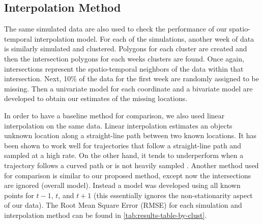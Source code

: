 \documentclass[12pt]{article}
\begin{document}
\hypertarget{interpolation-method}{%
\subsection{Interpolation Method}\label{interpolation-method}}

The same simulated data are also used to check the performance of our
spatio-temporal interpolation model. For each of the simulations,
another week of data is similarly simulated and clustered. Polygons for
each cluster are created and then the intersection polygons for each
weeks clusters are found. Once again, intersections represent the
spatio-temporal neighbors of the data within that intersection. Next,
10\% of the data for the first week are randomly assigned to be missing.
Then a univariate model for each coordinate and a bivariate model are
developed to obtain our estimates of the missing locations.

In order to have a baseline method for comparison, we also used linear
interpolation on the same data. Linear interpolation estimates an
objects unknown location along a straight-line path between two known
locations. It has been shown to work well for trajectories that follow a
straight-line path and sampled at a high rate. On the other hand, it
tends to underperform when a trajectory follows a curved path or is not
heavily sampled \citep{wentz_comparison_2003, guo_improved_2021}.
Another method used for comparison is similar to our proposed method,
except now the intersections are ignored (overall model). Instead a
model was developed using all known points for \(t-1\), \(t\), and
\(t+1\) (this essentially ignores the non-stationarity aspect of our
data). The Root Mean Square Error (RMSE) for each simulation and
interpolation method can be found in \cref{tab:results-table-by-clust}.
\end{document}
